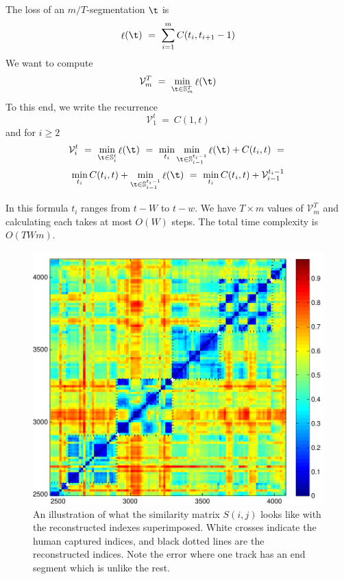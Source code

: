 \documentclass[twocolumn]{article}
\DeclareMathOperator{\loss}{\ell}
\newcommand{\segs}{\mathbb S}
\newcommand{\best}{\mathcal V}
\begin{document}
The loss of an $m/T$-segmentation $\t$ is 
\[
\loss(\t) 
~=~
\sum_{i=1}^m C(t_i, t_{i+1}-1)
\]
We want to compute
\[
\best^T_m ~=~ \min_{\t \in \segs^T_m} \loss(\t)
\]
To this end, we write the recurrence
\begin{equation*}
\best^t_1 ~=~ C(1, t) 
\end{equation*}
and for $i\ge2$
\begin{multline*}
\best^t_i ~=~
\min_{\t \in \segs^t_i} \loss(\t)
~=~ \min_{t_i} \min_{\t \in \segs^{t_i-1}_{i-1}} \loss(\t) + C(t_i, t)~=~  \\
\min_{t_i} C(t_i, t) + \min_{\t \in \segs^{t_i-1}_{i-1}} \loss(\t) 
~=~ \min_{t_i} C(t_i, t) + \best^{t_i-1}_{i-1}
\end{multline*}

In this formula $t_i$ ranges from $t-W$ to $t-w$. We have $T \times m$ values of $\best^T_m$ and calculating each takes at most $O(W)$ steps. The total time complexity is $O(TWm)$.

\begin{figure}[t]
\centering
\includegraphics[width=\textwidth]{images/simmat_preds}

\caption{An illustration of what the similarity matrix $S(i,j)$ looks like with the reconstructed indexes superimposed. White crosses indicate the human captured indices, and black dotted lines are the reconstructed indices. Note the error where one track has an end segment which is unlike the rest. }
\label{fig:predictions}
\end{figure} 
\end{document}
